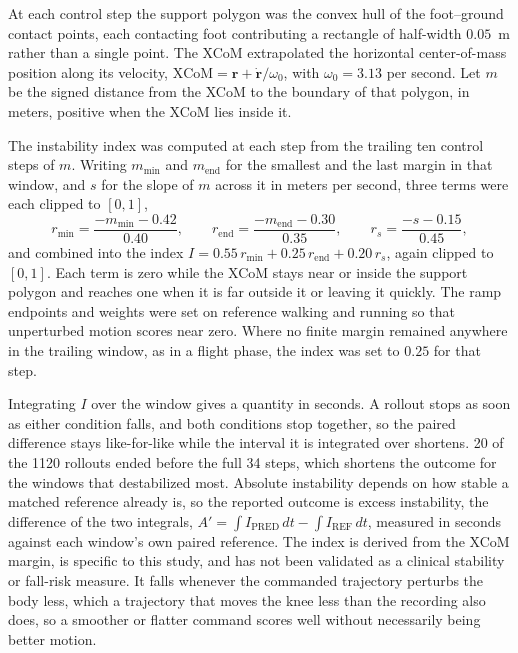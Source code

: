 \documentclass[referee,lineno,pdflatex,sn-vancouver-num]{sn-jnl}
\begin{document}
At each control step the support polygon was the convex hull of the
foot--ground contact points, each contacting foot contributing a rectangle of
half-width $0.05$~m rather than a single point. The XCoM extrapolated the
horizontal center-of-mass position along its velocity, $\mathrm{XCoM} =
\mathbf{r} + \dot{\mathbf{r}}/\omega_0$, with $\omega_0 = 3.13$ per
second. Let $m$ be the signed distance from the
XCoM to the boundary of that polygon, in meters, positive when the XCoM lies
inside it.

The instability index was computed at each step from the trailing ten control
steps of $m$. Writing $m_{\mathrm{min}}$ and $m_{\mathrm{end}}$ for the
smallest and the last margin in that window, and $s$ for the slope of $m$ across
it in meters per second, three terms were each clipped to $[0,1]$,
\begin{equation}
r_{\mathrm{min}}=\frac{-m_{\mathrm{min}}-0.42}{0.40},\qquad
r_{\mathrm{end}}=\frac{-m_{\mathrm{end}}-0.30}{0.35},\qquad
r_{s}=\frac{-s-0.15}{0.45},
\end{equation}
and combined into the index
$I=0.55\,r_{\mathrm{min}}+0.25\,r_{\mathrm{end}}+0.20\,r_{s}$, again
clipped to $[0,1]$. Each term is zero while the XCoM stays near or inside the
support polygon and reaches one when it is far outside it or leaving it quickly.
The ramp endpoints and weights were set on reference walking and running so that
unperturbed motion scores near zero. Where no finite margin remained anywhere in the trailing window, as in a
flight phase, the index was set to $0.25$ for that step.

Integrating $I$ over the window gives a quantity in seconds. A rollout stops as
soon as either condition falls, and both conditions stop together, so the paired
difference stays like-for-like while the interval it is integrated over
shortens. 20 of the 1120 rollouts ended before the
full 34 steps, which shortens the outcome for the windows that
destabilized most. Absolute instability depends on how stable a
matched reference already is,
so the reported outcome is excess instability, the difference of the two
integrals, $A'=\int I_{\mathrm{PRED}}\,dt-\int I_{\mathrm{REF}}\,dt$,
measured in seconds against each window's own paired reference. The index is derived from
the XCoM margin, is specific to this study, and has not been validated as a
clinical stability or fall-risk measure. It falls whenever the commanded
trajectory perturbs the body less, which a trajectory that moves the knee less
than the recording also does, so a smoother or flatter command scores well
without necessarily being better motion.
\end{document}
